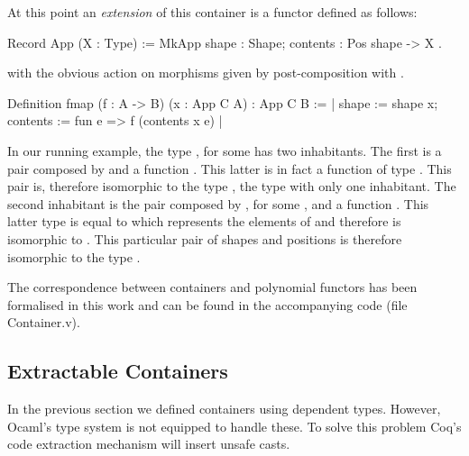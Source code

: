 \documentclass[ a4paper, UKenglish, cleveref, autoref, thm-restate]{lipics-v2021}
\begin{document}
At this point an \emph{extension} of this container is a functor defined as
follows:
\begin{coqcode}
Record App (X : Type) := MkApp { shape : Shape; contents : Pos shape -> X }.
\end{coqcode}
with the obvious action on morphisms given by post-composition
with .
\begin{coqcode}
Definition fmap (f : A -> B) (x : App C A) : App C B
  := {| shape := shape x; contents := fun e => f (contents x e) |}
\end{coqcode}
In our running example, the type , for some  has two
inhabitants.  The first is a pair composed by  and a
function . This latter is in fact a function of
type . This pair is, therefore isomorphic to the
type , the type with only one inhabitant.  The second inhabitant is
the pair composed by , for some , and a
function .  This latter type is equal to 
which represents the elements of  and therefore is isomorphic to .
This particular pair of shapes and positions is  therefore isomorphic to the
type .

The correspondence between containers and polynomial functors has been
formalised in this work and can be found in the accompanying code (file
Container.v). 
% 

\subsection{Extractable Containers}
In the previous section we defined containers using dependent types.  However,
Ocaml's type system is not equipped to handle these. To solve this problem
Coq's code extraction mechanism will insert unsafe casts.
\end{document}
